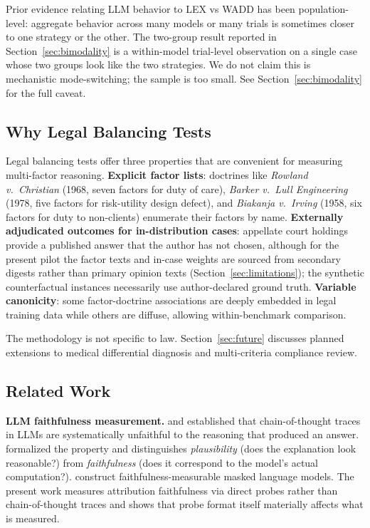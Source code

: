 \documentclass[11pt]{article}
\begin{document}
Prior evidence relating LLM behavior to LEX vs WADD has been population-level: aggregate behavior across many models or many trials is sometimes closer to one strategy or the other. The two-group result reported in Section~\ref{sec:bimodality} is a within-model trial-level observation on a single case whose two groups look like the two strategies. We do not claim this is mechanistic mode-switching; the sample is too small. See Section~\ref{sec:bimodality} for the full caveat.

\subsection{Why Legal Balancing Tests}

Legal balancing tests offer three properties that are convenient for measuring multi-factor reasoning. \textbf{Explicit factor lists}: doctrines like \emph{Rowland v.\ Christian} (1968, seven factors for duty of care), \emph{Barker v.\ Lull Engineering} (1978, five factors for risk-utility design defect), and \emph{Biakanja v.\ Irving} (1958, six factors for duty to non-clients) enumerate their factors by name. \textbf{Externally adjudicated outcomes for in-distribution cases}: appellate court holdings provide a published answer that the author has not chosen, although for the present pilot the factor texts and in-case weights are sourced from secondary digests rather than primary opinion texts (Section~\ref{sec:limitations}); the synthetic counterfactual instances necessarily use author-declared ground truth. \textbf{Variable canonicity}: some factor-doctrine associations are deeply embedded in legal training data while others are diffuse, allowing within-benchmark comparison.

The methodology is not specific to law. Section~\ref{sec:future} discusses planned extensions to medical differential diagnosis and multi-criteria compliance review.

\subsection{Related Work}

\textbf{LLM faithfulness measurement.} \citet{turpin2023} and \citet{lanham2023} established that chain-of-thought traces in LLMs are systematically unfaithful to the reasoning that produced an answer. \citet{jacovi2020} formalized the property and distinguishes \emph{plausibility} (does the explanation look reasonable?) from \emph{faithfulness} (does it correspond to the model's actual computation?). \citet{madsen2024} construct faithfulness-measurable masked language models. The present work measures attribution faithfulness via direct probes rather than chain-of-thought traces and shows that probe format itself materially affects what is measured.
\end{document}
